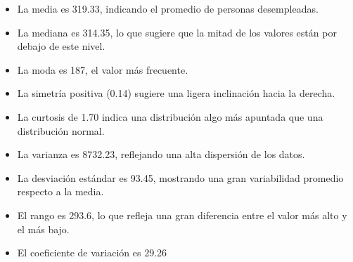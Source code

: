 \documentclass{article}
\begin{document}
\begin{itemize}
\begin{itemize}
\begin{figure}[H]
        \end{figure}
            \begin{itemize}
                \item La media es 319.33, indicando el promedio de personas desempleadas.
                \item La mediana es 314.35, lo que sugiere que la mitad de los valores están por debajo de este nivel.
                \item La moda es 187, el valor más frecuente.
                \item La simetría positiva (0.14) sugiere una ligera inclinación hacia la derecha.
                \item La curtosis de 1.70 indica una distribución algo más apuntada que una distribución normal.
                \item La varianza es 8732.23, reflejando una alta dispersión de los datos.
                \item La desviación estándar es 93.45, mostrando una gran variabilidad promedio respecto a la media.
                \item El rango es 293.6, lo que refleja una gran diferencia entre el valor más alto y el más bajo.
                \item El coeficiente de variación es 29.26%
            \end{itemize}
    \end{itemize}
    

\end{itemize}
\end{document}
